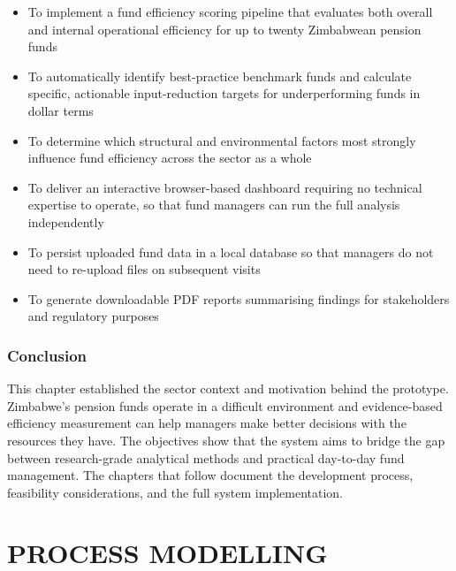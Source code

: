 \documentclass[12pt,a4paper]{report}
\begin{document}
\begin{itemize}
  \item To implement a fund efficiency scoring pipeline that evaluates both overall and
        internal operational efficiency for up to twenty Zimbabwean pension funds

  \item To automatically identify best-practice benchmark funds and calculate specific,
        actionable input-reduction targets for underperforming funds in dollar terms

  \item To determine which structural and environmental factors most strongly influence
        fund efficiency across the sector as a whole

  \item To deliver an interactive browser-based dashboard requiring no technical expertise
        to operate, so that fund managers can run the full analysis independently

  \item To persist uploaded fund data in a local database so that managers do not need to
        re-upload files on subsequent visits

  \item To generate downloadable PDF reports summarising findings for stakeholders and
        regulatory purposes
\end{itemize}

\subsection*{Conclusion}

This chapter established the sector context and motivation behind the prototype.
Zimbabwe's pension funds operate in a difficult environment and evidence-based efficiency
measurement can help managers make better decisions with the resources they have. The
objectives show that the system aims to bridge the gap between research-grade analytical
methods and practical day-to-day fund management. The chapters that follow document the
development process, feasibility considerations, and the full system implementation.

\chapter{PROCESS MODELLING}
\end{document}
